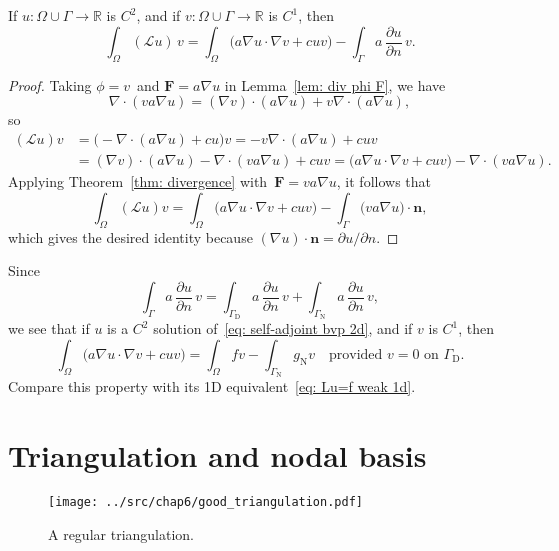 \begin{theorem}\label{thm: first Green}
If $u:\Omega\cup\Gamma\to\mathbb{R}$ is $C^2$, and if 
$v:\Omega\cup\Gamma\to\mathbb{R}$ is $C^1$, then
\[
\int_\Omega(\mathcal{L}u)\,v
	=\int_\Omega\bigl(a\nabla u\cdot\nabla v+cuv\bigr)
	-\int_\Gamma a\,\frac{\partial u}{\partial n}\,v.
\]
\end{theorem}
\begin{proof}
Taking $\phi=v$~and $\boldsymbol{F}=a\nabla u$ in Lemma~\ref{lem: div phi F}, 
we have
\[
\nabla\cdot(va\nabla u)=(\nabla v)\cdot(a\nabla u)+v\nabla\cdot(a\nabla u),
\]
so
\begin{align*}
(\mathcal{L}u)v&=\bigl(-\nabla\cdot(a\nabla u)+cu\bigr)v
	=-v\nabla\cdot(a\nabla u)+cuv\\
	&=(\nabla v)\cdot(a\nabla u)-\nabla\cdot(va\nabla u)+cuv
	=\bigl(a\nabla u\cdot\nabla v+cuv)-\nabla\cdot(va\nabla u).
\end{align*}
Applying Theorem~\ref{thm: divergence} with~$\boldsymbol{F}=va\nabla u$, it 
follows that
\[
\int_\Omega(\mathcal{L}u)v=\int_\Omega\bigl(a\nabla u\cdot\nabla v+cuv\bigr)
	-\int_\Gamma\boldsymbol(va\nabla u)\cdot\boldsymbol{n},
\]
which gives the desired identity because 
$(\nabla u)\cdot\boldsymbol{n}=\partial u/\partial n$.
\end{proof}

Since 
\[
\int_\Gamma a\,\frac{\partial u}{\partial n}\,v
	=\int_{\Gamma_{\mathrm{D}}} a\,\frac{\partial u}{\partial n}\,v
	+\int_{\Gamma_{\mathrm{N}}} a\,\frac{\partial u}{\partial n}\,v,
\]
we see that if $u$ is a $C^2$ solution of~\eqref{eq: self-adjoint bvp 2d}, and 
if $v$ is $C^1$, then
\begin{equation}\label{eq: Lu=f weak 2d}
\int_\Omega\bigl(a\nabla u\cdot\nabla v+cuv\bigr)=\int_\Omega fv
	-\int_{\Gamma_{\mathrm{N}}}g_{\mathrm{N}}v
	\quad\text{provided $v=0$ on $\Gamma_{\mathrm{D}}$.}
\end{equation}
Compare this property with its 1D equivalent~\eqref{eq: Lu=f weak 1d}.

\section{Triangulation and nodal basis}

\begin{figure}
\caption{A regular triangulation.}\label{fig: good Th}
\begin{center}
\texttt{[image: ../src/chap6/good\_triangulation.pdf]} 
\end{center}
\end{figure}

